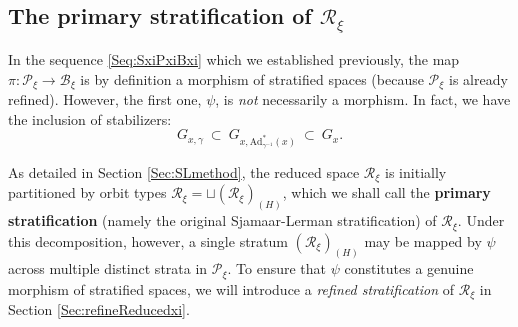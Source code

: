 \documentclass[12pt]{amsart}
\theoremstyle{definition}
\numberwithin{equation}{section}
\newcommand{\Reducedxi}{\mathcal{R}_\xi}
\newcommand{\Pxi}{\mathcal{P}_{\xi}}
\newcommand{\Bxi}{\mathcal{B}_{\xi}}
\newcommand{\Adjointaction}{\mathrm{Ad}}
\begin{document}
	
	
 	
	
	\subsection{The primary stratification of $\Reducedxi$}
	\label{subsubSec:psipi} In the sequence \eqref{Seq:SxiPxiBxi} which we established previously, 
the map $\pi: \Pxi\to \Bxi$ is by definition a morphism of stratified spaces (because $\Pxi$ is already refined). However, the first one, $\psi$, is \textit{not} necessarily a morphism. In fact, we have  the inclusion of stabilizers:
		\begin{equation}\label{Eqt:inclusionofGstuff}
		G_{x,\gamma}~\subset~ G_{x, {\Adjointaction^*_{\gamma^{-1}}}(x)} ~\subset~ G_{x}.
	\end{equation}
	

 

As detailed in Section \ref{Sec:SLmethod}, the reduced space $\Reducedxi$ is initially partitioned by orbit types   $\Reducedxi = \sqcup (\Reducedxi)_{(H)}$, which we shall call the \textbf{primary stratification} (namely the original Sjamaar-Lerman stratification) of $\Reducedxi$. Under this decomposition, however, a single stratum $(\Reducedxi)_{(H)}$ may be mapped by $\psi$ across multiple distinct strata in $\Pxi$. To ensure that $\psi$ constitutes a genuine morphism of stratified spaces, we will introduce a \textit{refined stratification} of $\Reducedxi$ in Section \ref{Sec:refineReducedxi}.
\end{document}
